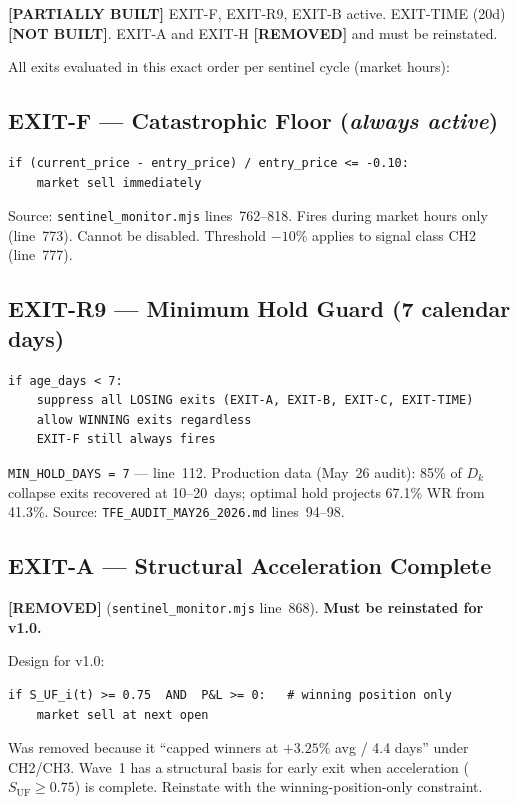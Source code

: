 \documentclass[11pt,a4paper]{article}
\newcommand{\statuspartial}{\textcolor{statuspartial}{\textbf{[PARTIALLY BUILT]}}}
\newcommand{\statusnotbuilt}{\textcolor{statusnotbuilt}{\textbf{[NOT BUILT]}}}
\newcommand{\statusremoved}{\textcolor{statusnotbuilt}{\textbf{[REMOVED]}}}
\newcommand{\code}[1]{\texttt{\small#1}}
\begin{document}
\statuspartial{} EXIT-F, EXIT-R9, EXIT-B active. EXIT-TIME (20d) \statusnotbuilt. EXIT-A and EXIT-H \statusremoved{} and must be reinstated.

All exits evaluated in this exact order per sentinel cycle (market hours):

\subsection{EXIT-F — Catastrophic Floor (\emph{always active})}

\begin{lstlisting}
if (current_price - entry_price) / entry_price <= -0.10:
    market sell immediately
\end{lstlisting}

Source: \texttt{sentinel\_monitor.mjs} lines~762--818. Fires during market hours only (line~773). Cannot be disabled. Threshold $-10\%$ applies to signal class CH2 (line~777).

\subsection{EXIT-R9 — Minimum Hold Guard (7 calendar days)}

\begin{lstlisting}
if age_days < 7:
    suppress all LOSING exits (EXIT-A, EXIT-B, EXIT-C, EXIT-TIME)
    allow WINNING exits regardless
    EXIT-F still always fires
\end{lstlisting}

\code{MIN\_HOLD\_DAYS = 7} — line~112. Production data (May~26 audit): 85\% of $D_k$ collapse exits recovered at 10--20~days; optimal hold projects 67.1\% WR from 41.3\%. Source: \texttt{TFE\_AUDIT\_MAY26\_2026.md} lines~94--98.

\subsection{EXIT-A — Structural Acceleration Complete}

\statusremoved{} (\texttt{sentinel\_monitor.mjs} line~868). \textbf{Must be reinstated for v1.0.}

Design for v1.0:
\begin{lstlisting}
if S_UF_i(t) >= 0.75  AND  P&L >= 0:   # winning position only
    market sell at next open
\end{lstlisting}

Was removed because it ``capped winners at $+3.25\%$ avg / 4.4 days'' under CH2/CH3. Wave~1 has a structural basis for early exit when acceleration ($S_{\text{UF}}\geq 0.75$) is complete. Reinstate with the winning-position-only constraint.
\end{document}
